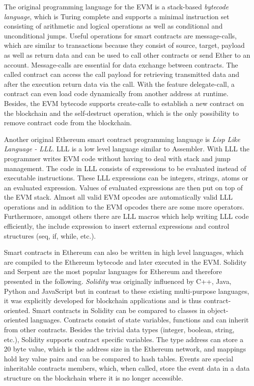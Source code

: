 \documentclass[conference]{IEEEtran}
\begin{document}
The original programming language for the EVM is a stack-based \textit{bytecode language}, which is Turing complete and supports a minimal instruction set consisting of arithmetic and logical operations as well as conditional and unconditional jumps. Useful operations for smart contracts are message-calls, which are similar to transactions because they consist of source, target, payload as well as return data and can be used to call other contracts or send Ether to an account. Message-calls are essential for data exchange between contracts. The called contract can access the call payload for retrieving transmitted data and after the execution return data via the call. With the feature delegate-call, a contract can even load code dynamically from another address at runtime. Besides, the EVM bytecode supports create-calls to establish a new contract on the blockchain and the self-destruct operation, which is the only possibility to remove contract code from the blockchain. \cite{Bartoletti2017} \cite{McAdams2017} \cite{Solidity2017}\par 
Another original Ethereum smart contract programming language is \textit{Lisp Like Language - LLL}. LLL is a low level language similar to Assembler. With LLL the programmer writes EVM code without having to deal with stack and jump management. The code in LLL consists of expressions to be evaluated instead of executable instructions. These LLL expressions can be integers, strings, atoms or an evaluated expression. Values of evaluated expressions are then put on top of the EVM stack. Almost all valid EVM opcodes are automatically valid LLL operations and in addition to the EVM opcodes there are some more operators. Furthermore, amongst others there are LLL macros which help writing LLL code efficiently, the include expression to insert external expressions and control structures (seq, if, while, etc.). \cite{Edgington2017} \par 
Smart contracts in Ethereum can also be written in high level languages, which are compiled to the Ethereum bytecode and later executed in the EVM. Solidity and Serpent are the most popular languages for Ethereum and therefore presented in the following. \textit{Solidity} was originally influenced by C++, Java, Python and JavaScript but in contrast to these existing multi-purpose languages, it was explicitly developed for blockchain applications and is thus contract-oriented. Smart contracts in Solidity can be compared to classes in object-oriented languages. Contracts consist of state variables, functions and can inherit from other contracts. Besides the trivial data types (integer, boolean, string, etc.), Solidity supports contract specific variables. The type address can store a 20 byte value, which is the address size in the Ethereum network, and mappings hold key value pairs and can be compared to hash tables. Events are special inheritable contracts members, which, when called, store the event data in a data structure on the blockchain where it is no longer accessible. \cite{McAdams2017} \cite{Solidity2017}\par 
\end{document}
